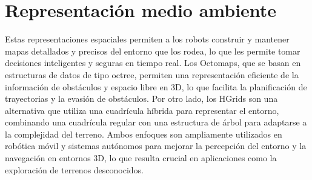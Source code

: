 
\section{Representación medio ambiente}


Estas representaciones espaciales permiten a los robots construir y mantener mapas detallados y precisos del entorno que los rodea, lo que les permite tomar decisiones inteligentes y seguras en tiempo real. Los Octomaps, que se basan en estructuras de datos de tipo octree, permiten una representación eficiente de la información de obstáculos y espacio libre en 3D, lo que facilita la planificación de trayectorias y la evasión de obstáculos. Por otro lado, los HGrids son una alternativa que utiliza una cuadrícula híbrida para representar el entorno, combinando una cuadrícula regular con una estructura de árbol para adaptarse a la complejidad del terreno. Ambos enfoques son ampliamente utilizados en robótica móvil y sistemas autónomos para mejorar la percepción del entorno y la navegación en entornos 3D, lo que resulta crucial en aplicaciones como la exploración de terrenos desconocidos.


